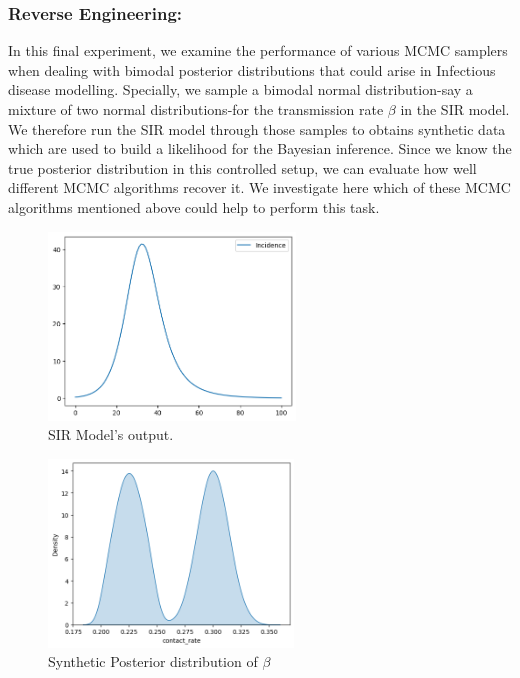 \documentclass[nonatbib,preprint,12pt,authoryear]{elsarticle}
\begin{document}
\subsubsection{Reverse Engineering:} 
In this final experiment, we examine the performance of various MCMC samplers when dealing with bimodal posterior distributions that could arise in Infectious disease modelling.
Specially, we sample a bimodal normal distribution-say a mixture of two normal distributions-for the transmission rate $\beta$ in the SIR model. We therefore run the SIR model through those samples to obtains synthetic data which are used to build a likelihood for the Bayesian inference. Since we know the true posterior distribution in this controlled setup, we can evaluate how well different MCMC algorithms recover it. We investigate here which of these MCMC algorithms mentioned above could help to perform this task.
\begin{figure}[H]
    \centering
    \includegraphics[width = 0.68\linewidth, height = 5cm]{Figures/Reverse-Ingineering/Model_output.png}
    \caption{SIR Model's output.}
    \label{fig:SIR_reverse_Engi_output}
\end{figure}
\begin{figure}[H]
    \centering
    \includegraphics[width = 0.7\linewidth, height = 5cm]{Figures/Reverse-Ingineering/True_posterior.png}
    \caption{Synthetic Posterior distribution of $\beta$}
    \label{fig:True_sample_with_junction}
    \label{fig:Reverse_Ingineering_output_posterior}
\end{figure}
\end{document}
